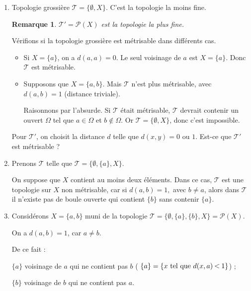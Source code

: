 \documentclass[french]{book}
\newtheorem*{remark}{Remarque}
\newcommand{\lesss}{\rotatebox[origin=c]{90}{$\land$}}
\newcommand{\less}{\ \lesss\ }
\begin{document}
\begin{enumerate}
  \item Topologie grossière $\mathscr{T}= \{ \emptyset, X \} $. C'est la topologie la moins fine.

  \begin{remark}
    $\mathscr{T}' = \mathscr{P}(X)  $ est la topologie la plus fine.
  \end{remark}

  Vérifions si la topologie grossière est métrisable dans différents cas.
  \begin{itemize}
    \item Si $X = \{ a \} $, on a $d(a,a) =0$. Le seul voisinage de $a$ est $X = \{ a \} $. Donc $\mathscr{T} $ est métrisable.
    \item Supposons que $X = \{ a,b \} $. Mais $\mathscr{T} $ n'est plus métrisable, avec $d(a,b) =1$ (distance triviale).

    Raisonnons par l'absurde. Si $\mathscr{T} $ était métrisable, $\mathscr{T} $ devrait contenir un ouvert $\Omega$ tel que $a \in \Omega$ et $b \notin \Omega$. Or $\mathscr{T} = \{ \emptyset, X \} $, donc c'est impossible.
  \end{itemize}

  Pour $\mathscr{T}' $, on choisit la distance $d$ telle que $d(x,y) = 0 \text{ ou } 1$. Est-ce que $\mathscr{T}' $ est métrisable ?

  \item Prenons $\mathscr{T} $ telle que $\mathscr{T} = \{ \emptyset, \{ a \} , X \} $.

  On suppose que $X$ contient au moins deux éléments. Dans ce cas, $\mathscr{T} $ est une topologie sur $X$ non métrisable, car si $d(a,b)=1,$ avec $ b \neq a$, alors dans $\mathscr{T} $ il n'existe pas de boule ouverte qui contient $\{ b \} $ sans contenir $\{ a \} $.

  \item Considérons $X = \{ a,b \}$ muni de la topologie $  \mathscr{T} = \{ \emptyset, \{ a \}, \{ b \}, X \} = \mathscr{P}(X)  $.

  On a $d(a,b) = 1$, car $a \neq b$.

  De ce fait :

  $\{ a \} $ voisinage de $a$ qui ne contient pas $b$ ( $\{ a \} = \{ x \text{ tel que } d(x,a) \less 1 \} $) ;

  $\{ b \} $ voisinage de $b$ qui ne contient pas $a$.




\end{enumerate}
\end{document}
